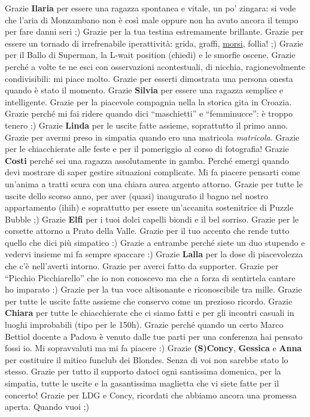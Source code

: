 \documentclass[10pt]{amsart}
\newcommand{\n}[1]{{\Large \bf #1}}
\begin{document}
Grazie \n{Ilaria} per essere una ragazza spontanea e vitale, un po' zingara: si vede che l'aria di Monzambano non è così male oppure non ha avuto ancora il tempo per fare danni seri ;) Grazie per la tua testina estremamente brillante. Grazie per essere un tornado di irrefrenabile iperattività: grida, graffi, \underline{morsi}, follia! ;) Grazie per il Ballo di Superman, la L-wait position (chiedi) e le smorfie oscene. Grazie perché a volte te ne esci con osservazioni acontestuali, di nicchia, ragionevolmente condivisibili: mi piace molto. Grazie per esserti dimostrata una persona onesta quando è stato il momento.
Grazie \n{Silvia} per essere una ragazza semplice e intelligente. Grazie per la piacevole compagnia nella la storica gita in Croazia. Grazie perché mi fai ridere quando dici ``maschietti'' e ``femminucce'': è troppo tenero :) 
Grazie \n{Linda} per le uscite fatte assieme, soprattutto il primo anno. Grazie per avermi preso in simpatia quando ero una matricola \emph{matricola}. Grazie per le chiacchierate alle feste e per il pomeriggio al corso di fotografia!
Grazie \n{Costi} perché sei una ragazza assolutamente in gamba. Perché emergi quando devi mostrare di saper gestire situazioni complicate. Mi fa piacere pensarti come un'anima a tratti scura con una chiara aurea argento attorno. Grazie per tutte le uscite dello scorso anno, per aver (quasi) inaugurato il bagno nel nostro appartamento (ihih) e soprattutto per essere un'accanita sostenitrice di Puzzle Bubble ;)
Grazie \n{Elfi} per i tuoi dolci capelli biondi e il bel sorriso. Grazie per le corsette attorno a Prato della Valle. Grazie per il tuo accento che rende tutto quello che dici più simpatico :) Grazie a entrambe perché siete un duo stupendo e vedervi insieme mi fa sempre spaccare :)
Grazie \n{Lalla} per la dose di piacevolezza che c'è nell'averti intorno. Grazie per averci fatto da supporter. Grazie per ``Picchio Picchiarello'' che io non conoscevo ma che a forza di sentirtela cantare ho imparato :) Grazie per la tua voce altisonante e riconoscibile tra mille. Grazie per tutte le uscite fatte assieme che conservo come un prezioso ricordo.  
Grazie \n{Chiara} per tutte le chiacchierate che ci siamo fatti e per gli incontri casuali in luoghi improbabili (tipo per le 150h). Grazie perché quando un certo Marco Bettiol docente a Padova è venuto dalle tue parti per una conferenza hai pensato fossi io. Mi sopravvaluti ma mi fa piacere :)
Grazie \n{(S)Concy}, \n{Gessica} e \n{Anna} per costituire il mitico funclub dei Blondes. Senza di voi non sarebbe stato lo stesso. Grazie per tutto il supporto datoci ogni santissima domenica, per la simpatia, tutte le uscite e la gasantissima maglietta che vi siete fatte per il concerto! Grazie per LDG e Concy, ricordati che abbiamo ancora una promessa aperta. Quando vuoi ;)
\end{document}
